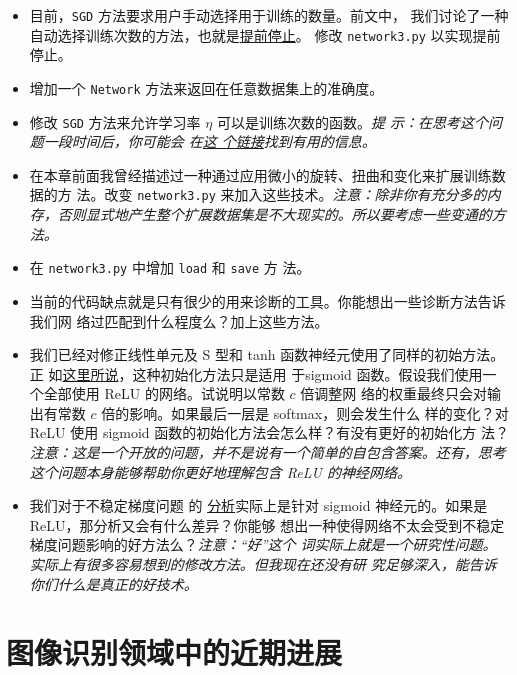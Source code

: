 \begin{itemize}
\item 目前，\lstinline!SGD! 方法要求用户手动选择用于训练\epochs{}的数量。前文中，
  我们讨论了一种自动选择训练次数的方法，也就是\hyperref[early_stopping]{提前停止}。
  修改 \lstinline!network3.py! 以实现提前停止。
\item 增加一个 \lstinline!Network! 方法来返回在任意数据集上的准确度。
\item 修改 \lstinline!SGD! 方法来允许学习率 $\eta$ 可以是训练次数的函数。\emph{提
    示：在思考这个问题一段时间后，你可能会
    在\href{https://groups.google.com/forum/\#!topic/theano-users/NQ9NYLvleGc}{这
      个链接}找到有用的信息。}
\item 在本章前面我曾经描述过一种通过应用微小的旋转、扭曲和变化来扩展训练数据的方
  法。改变 \lstinline!network3.py! 来加入这些技术。\emph{注意：除非你有充分多的内
    存，否则显式地产生整个扩展数据集是不大现实的。所以要考虑一些变通的方法。}
\item 在 \lstinline!network3.py! 中增加 \lstinline!load! 和 \lstinline!save! 方
  法。
\item 当前的代码缺点就是只有很少的用来诊断的工具。你能想出一些诊断方法告诉我们网
  络过匹配到什么程度么？加上这些方法。
\item 我们已经对修正线性单元及 S 型和 tanh 函数神经元使用了同样的初始方法。正
  如\hyperref[sec:weight_initialization]{这里所说}，这种初始化方法只是适用
  于sigmoid 函数。假设我们使用一个全部使用 ReLU 的网络。试说明以常数 $c$ 倍调整网
  络的权重最终只会对输出有常数 $c$ 倍的影响。如果最后一层是 softmax，则会发生什么
  样的变化？对 ReLU 使用 sigmoid 函数的初始化方法会怎么样？有没有更好的初始化方
  法？\emph{注意：这是一个开放的问题，并不是说有一个简单的自包含答案。还有，思考
    这个问题本身能够帮助你更好地理解包含 ReLU 的神经网络。}
\item 我们对于不稳定梯度问题
  的%
  \hyperref[sec:what_is_causing_the_vanishing_gradient_problem_unstable_gradients_in_deep_neural_nets]{%
    分析}实际上是针对 sigmoid 神经元的。如果是 ReLU，那分析又会有什么差异？你能够
  想出一种使得网络不太会受到不稳定梯度问题影响的好方法么？\emph{注意：“好”这个
    词实际上就是一个研究性问题。实际上有很多容易想到的修改方法。但我现在还没有研
    究足够深入，能告诉你们什么是真正的好技术。}
\end{itemize}

\section{图像识别领域中的近期进展}
\label{sec:recent_progress_in_image_recognition}

